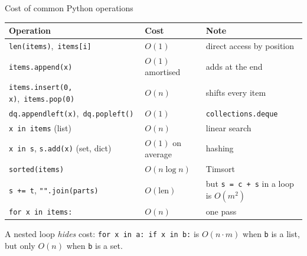 \documentclass[aspectratio=169,10pt]{beamer}
\begin{document}
\begin{frame}{Cost of common Python operations}
\renewcommand{\arraystretch}{1.25}\small
\begin{tabularx}{\textwidth}{@{}>{\raggedright}p{54mm}>{\raggedright}p{30mm}X@{}}
\toprule
Operation & Cost & Note\\\midrule
\texttt{len(items)},\ \texttt{items[i]} & $O(1)$ & direct access by position\\
\texttt{items.append(x)} & $O(1)$ amortised & adds at the end\\
\texttt{items.insert(0, x)},\ \texttt{items.pop(0)} & $O(n)$ & shifts every item\\
\texttt{dq.appendleft(x)},\ \texttt{dq.popleft()} & $O(1)$ & \texttt{collections.deque}\\
\texttt{x in items} (list) & $O(n)$ & linear search\\
\texttt{x in s}, \texttt{s.add(x)} (set, dict) & $O(1)$ on average & hashing\\
\texttt{sorted(items)} & $O(n\log n)$ & Timsort\\
\texttt{s += t}, \texttt{"".join(parts)} & $O(\text{len})$ & but \texttt{s = c + s} in a loop is $O(m^2)$\\
\texttt{for x in items:} & $O(n)$ & one pass\\
\bottomrule
\end{tabularx}
\vspace{3mm}

{\small A nested loop \emph{hides} cost: \texttt{for x in a: if x in b:} is $O(n\cdot m)$ when \texttt{b} is a list, but only $O(n)$ when \texttt{b} is a set.}
\end{frame}
\end{document}
